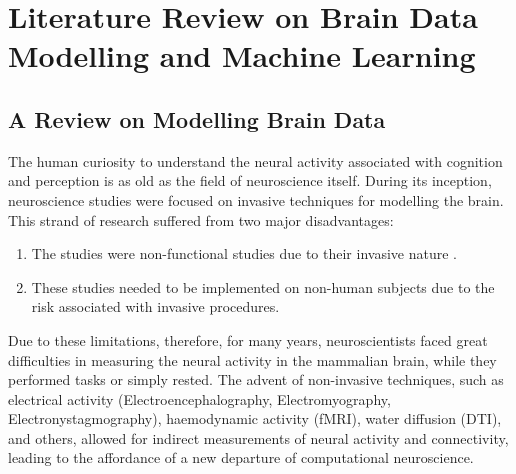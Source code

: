 \chapter{Literature Review on Brain Data Modelling and Machine Learning}

\section{A Review on Modelling Brain Data}
The human curiosity to understand the neural activity associated with cognition and perception is as old as the field of neuroscience itself. During its inception, neuroscience studies were focused on invasive techniques for modelling the brain. This strand of research suffered from two major disadvantages:
\begin{enumerate}
	\item The studies were non-functional studies due to their invasive nature \citep{geschwind1974disconnexion, shallice1988neuropsychology}.
	\item These studies needed to be implemented on non-human subjects \citep{felleman1991distributed, pandya1985architecture} due to the risk associated with invasive procedures.
\end{enumerate}
Due to these limitations, therefore, for many years, neuroscientists faced great difficulties in measuring the neural activity in the mammalian brain, while they performed tasks or simply rested. The advent of non-invasive techniques, such as electrical activity (Electroencephalography, Electromyography, Electronystagmography), haemodynamic activity (fMRI), water diffusion (DTI), and others, allowed for indirect measurements of neural activity and connectivity, leading to the affordance of a new departure of computational neuroscience. 
